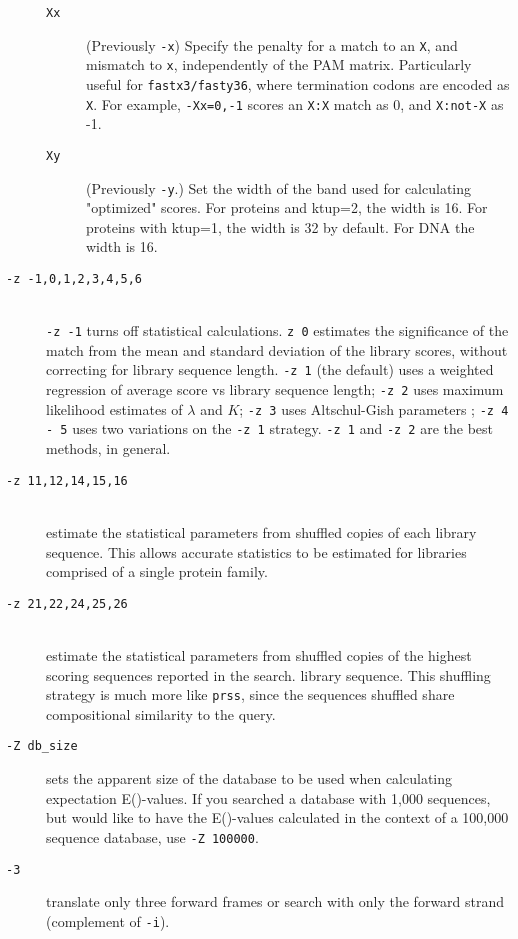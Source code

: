 \documentclass[11pt]{article}
\begin{document}
\begin{description}
\begin{description}
\item[\texttt{Xx}] (Previously \texttt{-x}) Specify the penalty for a
  match to an \texttt{X}, and mismatch to \texttt{x}, independently of
  the PAM matrix.  Particularly useful for \texttt{fastx3/fasty36},
  where termination codons are encoded as \texttt{X}.  For example,
  \texttt{-Xx=0,-1} scores an \texttt{X:X} match as 0, and
  \texttt{X:not-X} as -1.

\item[\texttt{Xy}] (Previously \texttt{-y}.) Set the width of the band
  used for calculating "optimized" scores.  For proteins and ktup=2,
  the width is 16.  For proteins with ktup=1, the width is 32 by
  default.  For DNA the width is 16.

\end{description}

\item[\texttt{-z -1,0,1,2,3,4,5,6}]\hfill\\
\texttt{-z -1} turns off statistical calculations. \texttt{z 0} estimates
the significance of the match from the mean and standard deviation of
the library scores, without correcting for library sequence length.
\texttt{-z 1} (the default) uses a weighted regression of average score
vs library sequence length; \texttt{-z 2} uses maximum likelihood
estimates of $\lambda$
and $K$; \texttt{-z 3} uses Altschul-Gish parameters \cite{alt960};
\texttt{-z 4 - 5} uses two variations on the \texttt{-z 1}
strategy. \texttt{-z 1} and \texttt{-z 2} are the best methods, in
general.
\item[\texttt{-z 11,12,14,15,16}]\hfill\\
estimate the statistical parameters from shuffled copies of each
library sequence.  This allows accurate statistics to be estimated for libraries comprised of a single protein family.

\item[\texttt{-z 21,22,24,25,26}]\hfill\\
estimate the statistical parameters from shuffled copies of the
highest scoring sequences reported in the search.
library sequence. This shuffling strategy is much more like
\texttt{prss}, since the sequences shuffled share compositional
similarity to the query.
\item[\texttt{-Z db\_size}]
sets the apparent size of the database to be used when calculating
expectation E()-values.  If you searched a database with 1,000
sequences, but would like to have the E()-values calculated in the
context of a 100,000 sequence database, use \texttt{-Z 100000}.
\item[\texttt{-3}]
translate only three forward frames or search with only the forward
strand (complement of \texttt{-i}).
\end{description}
\end{document}
